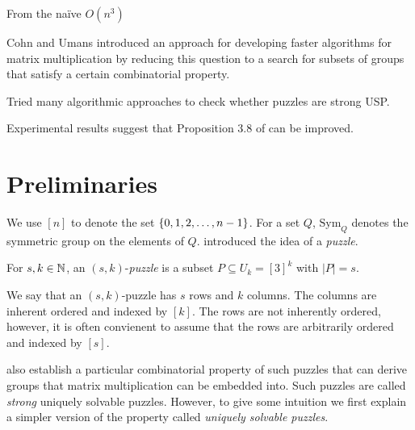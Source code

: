 \documentclass[11pt]{article}
\newcommand\sse{\subseteq}
\newcommand\Sym[1]{\ensuremath{\mathrm{Sym}_{#1}}}
\begin{document}
%





From the na\"{i}ve
$O(n^3)$

Cohn and Umans \cite{cu03} introduced an approach for developing
faster algorithms for matrix multiplication by reducing this question
to a search for subsets of groups that satisfy a certain combinatorial
property.




Tried many algorithmic approaches to check whether puzzles are strong USP.


Experimental results suggest that Proposition 3.8 of \cite{cksu05} can
be improved.




\section{Preliminaries}
\label{sec:prelim}

\newcommand\ordset[1]{\ensuremath{[#1]}}

We use $\ordset{n}$ to denote the set $\left\{ 0,1,2,\ldots, n-1 \right\}$.  For
a set $Q$, $\Sym{Q}$ denotes the symmetric group on the elements of
$Q$.  \cite{cksu05} introduced the idea of a \emph{puzzle}.

\begin{definition}[Puzzle]
  For $s, k \in \mathbb{N}$, an $(s,k)$-\emph{puzzle} is a
  subset $P \sse U_k = \ordset{3}^k$ with $|P| = s$.
\end{definition}

We say that an $(s,k)$-puzzle has $s$ rows and $k$ columns.  The
columns are inherent ordered and indexed by $\ordset{k}$.  The rows are not
inherently ordered, however, it is often convienent to assume that the
rows are arbitrarily ordered and indexed by $\ordset{s}$.

\cite{cksu05} also establish a particular combinatorial property of
such puzzles that can derive groups that matrix multiplication can be
embedded into.  Such puzzles are called \emph{strong} uniquely
solvable puzzles.  However, to give some intuition we first explain a
simpler version of the property called \emph{uniquely solvable
  puzzles}.
\end{document}
